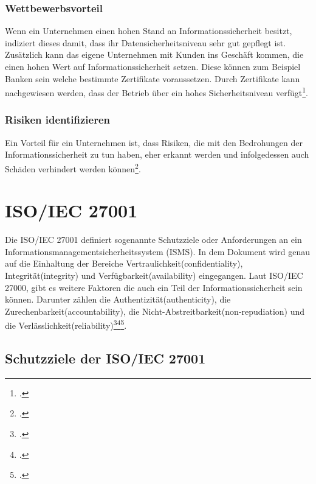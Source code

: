\subsubsection{Wettbewerbsvorteil}
Wenn ein Unternehmen einen hohen Stand an Informationssicherheit besitzt, indiziert dieses damit, dass ihr Datensicherheitsniveau sehr gut gepflegt ist. Zusätzlich kann das eigene Unternehmen mit Kunden ins Geschäft kommen, die einen hohen Wert auf Informationssicherheit setzen. Diese können zum Beispiel Banken sein welche bestimmte Zertifikate voraussetzen.
Durch Zertifikate kann nachgewiesen werden, dass der Betrieb über ein hohes Sicherheitsniveau verfügt\footcite{Lehrunterlagen-HTL-cloud}.


\subsubsection{Risiken identifizieren}
Ein Vorteil für ein Unternehmen ist, dass Risiken, die mit den Bedrohungen der Informationssicherheit zu tun haben, eher erkannt werden und infolgedessen auch Schäden verhindert werden können\footcite{Lehrunterlagen-HTL-cloud}.


\section{ISO/IEC 27001}
Die ISO/IEC 27001 definiert sogenannte Schutzziele oder Anforderungen an ein Informationsmanagementsicherheitssystem (ISMS). In dem Dokument wird genau auf die Einhaltung der Bereiche Vertraulichkeit(confidentiality), Integrität(integrity) und Verfügbarkeit(availability) eingegangen. Laut ISO/IEC 27000, gibt es weitere Faktoren die auch ein Teil der Informationssicherheit sein können. Darunter zählen die Authentizität(authenticity), die Zurechenbarkeit(accountability), die Nicht-Abstreitbarkeit(non-repudiation) und die Verlässlichkeit(reliability)\footcite{Lehrunterlagen-HTL-cloud}\footcite{schutzziele-iso27001-bsi}\footcite{schutzziele-iso27001}.


\subsection{Schutzziele der ISO/IEC 27001}
